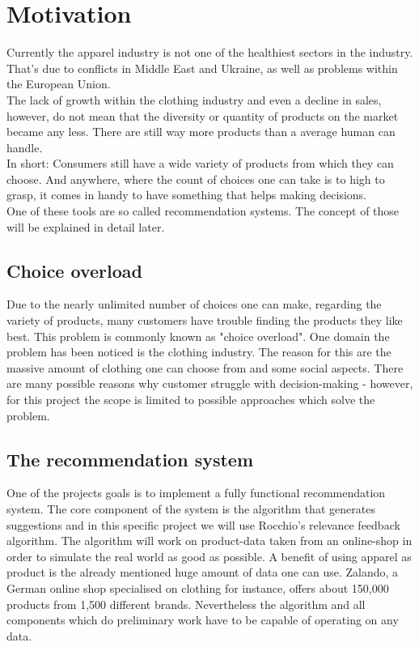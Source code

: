 

\section{Motivation}
Currently the apparel industry is not one of the healthiest sectors in the industry.
That's due to conflicts in Middle East and Ukraine, as well as problems within the European Union.\citep[p. 4]{alten:14}\\
The lack of growth within the clothing industry and even a decline in sales, however, do not mean that the diversity or quantity of products on the market became any less.
There are still way more products than a average human can handle.\\
In short: Consumers still have a wide variety of products from which they can choose.
And anywhere, where the count of choices one can take is to high to grasp, it comes in handy to have something that helps making decisions.\\
One of these tools are so called recommendation systems. The concept of those will be explained in detail later.


\subsection{Choice overload}
Due to the nearly unlimited number of choices one can make, regarding the variety of products, many customers have trouble finding the products they like best.
This problem is commonly known as "choice overload".\citep[p. 454]{stanton:12}
One domain the problem has been noticed is the clothing industry.
The reason for this are the massive amount of clothing one can choose from and some social aspects.
There are many possible reasons why customer struggle with decision-making\citep[p. 454]{stanton:12} - however, for this project the scope is limited to possible approaches which solve the problem.


\subsection{The recommendation system}
One of the projects goals is to implement a fully functional recommendation system.
The core component of the system is the algorithm that generates suggestions and in this specific project we will use Rocchio's relevance feedback algorithm.
The algorithm will work on product-data taken from an online-shop in order to simulate the real world as good as possible.
A benefit of using apparel as product is the already mentioned huge amount of data one can use.
Zalando, a German online shop specialised on clothing for instance, offers about 150,000 products from 1,500 different brands.\citep{visser:14}
Nevertheless the algorithm and all components which do preliminary work have to be capable of operating on any data.










